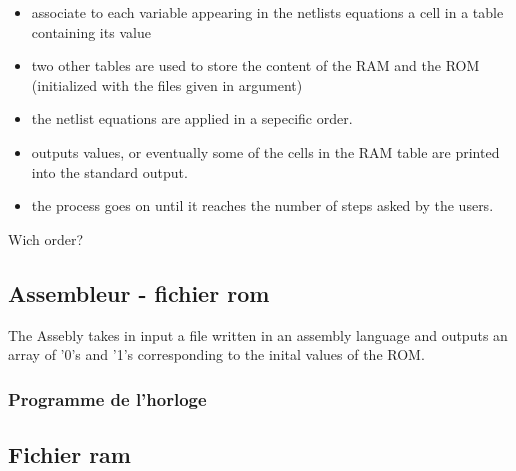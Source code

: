 \documentclass[c]{beamer}
\begin{document}
\begin{frame}
\begin{itemize}
\item associate to each variable appearing in the netlists equations a cell in a table containing its value
\item two other tables are used to store the content of the RAM and the ROM (initialized with the files given in argument)
\item the netlist equations are applied in a sepecific order.
\item outputs values, or eventually some of the cells in the RAM table are printed into the standard output.
\item the process goes on until it reaches the number of steps asked by the users.
\end{itemize}
\end{frame}

\begin{frame}
Wich order? 

\end{frame}

\subsection{Assembleur - fichier rom}

\begin{frame}
The Assebly takes in input a file written in an assembly language and outputs an array of '0's and '1's corresponding to the inital values of the ROM.

%
\end{frame}

\begin{frame}

\end{frame}

\begin{frame}
\frametitle{Programme de l'horloge}
\end{frame}

\subsection{Fichier ram}

\begin{frame}

\end{frame}
\end{document}
